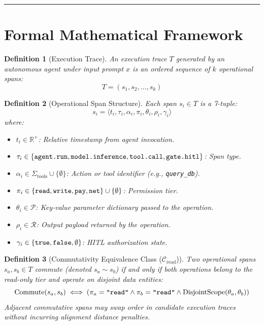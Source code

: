 \documentclass[11pt,a4paper]{article}
\newtheorem{definition}{Definition}
\begin{document}
\vspace{0.8em}
\hrule
\vspace{0.8em}

\section{Formal Mathematical Framework}

\begin{definition}[Execution Trace]
An execution trace $T$ generated by an autonomous agent under input prompt $x$ is an ordered sequence of $k$ operational spans:
\begin{equation}
T = (s_1, s_2, \dots, s_k)
\end{equation}
\end{definition}

\begin{definition}[Operational Span Structure]
Each span $s_i \in T$ is a 7-tuple:
\begin{equation}
s_i = \langle t_i, \tau_i, \alpha_i, \pi_i, \theta_i, \rho_i, \gamma_i \rangle
\end{equation}
where:
\begin{itemize}[noitemsep]
    \item $t_i \in \mathbb{R}^+$: Relative timestamp from agent invocation.
    \item $\tau_i \in \{\text{\texttt{agent.run}}, \text{\texttt{model.inference}}, \text{\texttt{tool.call}}, \text{\texttt{gate.hitl}}\}$: Span type.
    \item $\alpha_i \in \Sigma_{\text{tools}} \cup \{\emptyset\}$: Action or tool identifier (e.g., \texttt{query\_db}).
    \item $\pi_i \in \{\text{\texttt{read}}, \text{\texttt{write}}, \text{\texttt{pay}}, \text{\texttt{net}}\} \cup \{\emptyset\}$: Permission tier.
    \item $\theta_i \in \mathcal{P}$: Key-value parameter dictionary passed to the operation.
    \item $\rho_i \in \mathcal{R}$: Output payload returned by the operation.
    \item $\gamma_i \in \{\text{\texttt{true}}, \text{\texttt{false}}, \emptyset\}$: HITL authorization state.
\end{itemize}
\end{definition}

\begin{definition}[Commutativity Equivalence Class ($\mathcal{C}_{\text{read}}$)]
Two operational spans $s_a, s_b \in T$ commute (denoted $s_a \sim s_b$) if and only if both operations belong to the read-only tier and operate on disjoint data entities:
\begin{equation}
\text{Commute}(s_a, s_b) \iff (\pi_a = \text{\texttt{"read"}} \land \pi_b = \text{\texttt{"read"}} \land \text{DisjointScope}(\theta_a, \theta_b))
\end{equation}
Adjacent commutative spans may swap order in candidate execution traces without incurring alignment distance penalties.
\end{definition}
\end{document}
